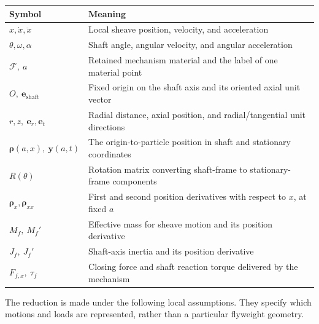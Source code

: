 \documentclass[11pt,letterpaper]{article}
\numberwithin{equation}{section}
\newcommand{\e}{\bm e_{\mathrm{shaft}}}
\newcommand{\rhoo}{\bm\rho}
\begin{document}
\begin{center}
\renewcommand{\arraystretch}{1.13}
\begin{tabularx}{\textwidth}{@{}lX@{}}
\toprule
Symbol & Meaning\\
\midrule
$x,\dot x,\ddot x$ & Local sheave position, velocity, and acceleration\\
$\theta,\omega,\alpha$ & Shaft angle, angular velocity, and angular acceleration\\
$\mathcal F,\ a$ & Retained mechanism material and the label of one material point\\
$O,\ \e$ & Fixed origin on the shaft axis and its oriented axial unit vector\\
$r,z,\ \bm e_r,\bm e_t$ & Radial distance, axial position, and radial/tangential unit directions\\
$\rhoo(a,x),\ \bm y(a,t)$ & The origin-to-particle position in shaft and stationary coordinates\\
$R(\theta)$ & Rotation matrix converting shaft-frame to stationary-frame components\\
$\rhoo_x,\rhoo_{xx}$ & First and second position derivatives with respect to $x$, at fixed $a$\\
$M_f,\ M_f'$ & Effective mass for sheave motion and its position derivative\\
$J_f,\ J_f'$ & Shaft-axis inertia and its position derivative\\
$F_{f,x},\ \tau_f$ & Closing force and shaft reaction torque delivered by the mechanism\\
\bottomrule
\end{tabularx}
\end{center}

The reduction is made under the following local assumptions. They specify which motions and loads are represented, rather than a particular flyweight geometry.
\end{document}
